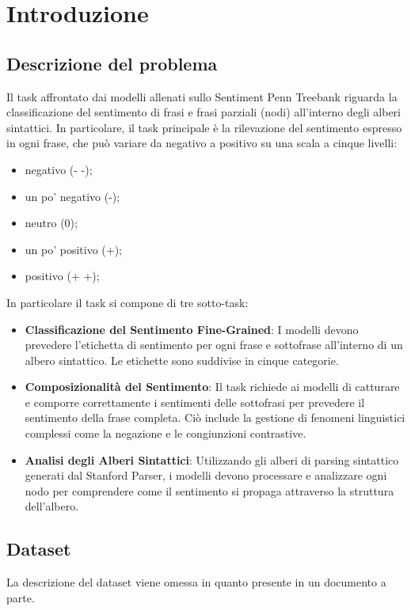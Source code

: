 \section{Introduzione}

\subsection{Descrizione del problema}

Il task affrontato dai modelli allenati sullo Sentiment Penn Treebank riguarda 
la classificazione del sentimento di frasi e frasi parziali (nodi) all'interno 
degli alberi sintattici. In particolare, il task principale è la rilevazione del 
sentimento espresso in ogni frase, che può variare da negativo a positivo su una 
scala a cinque livelli:
\begin{itemize}
	\item negativo (- -);
	\item un po' negativo (-);
	\item neutro (0);
	\item un po' positivo (+);
	\item positivo (+ +);
\end{itemize}

In particolare il task si compone di tre sotto-task:
\begin{itemize}
	\item \textbf{Classificazione del Sentimento Fine-Grained}: I modelli devono 
		prevedere l'etichetta di sentimento per ogni frase e sottofrase 
		all'interno di un albero sintattico. Le etichette sono suddivise in 
		cinque categorie.

	\item \textbf{Composizionalità del Sentimento}: Il task richiede ai modelli 
		di catturare e comporre correttamente i sentimenti delle sottofrasi per 
		prevedere il sentimento della frase completa. Ciò include la gestione di 
		fenomeni linguistici complessi come la negazione e le congiunzioni 
		contrastive.

	\item \textbf{Analisi degli Alberi Sintattici}: Utilizzando gli alberi di 
		parsing sintattico generati dal Stanford Parser, i modelli devono 
		processare e analizzare ogni nodo per comprendere come il sentimento si 
		propaga attraverso la struttura dell'albero.
\end{itemize}

\subsection{Dataset}

La descrizione del dataset viene omessa in quanto presente in un documento a
parte.

